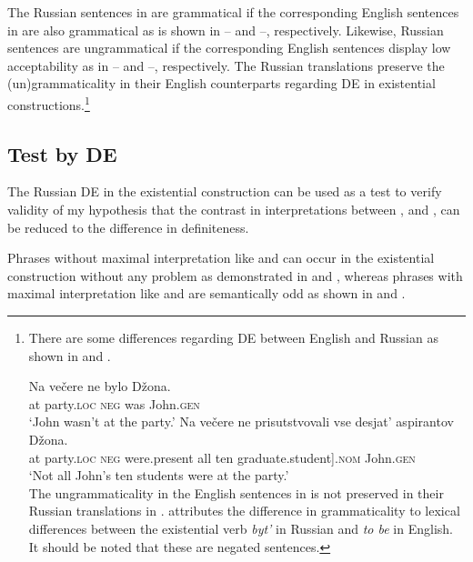 \documentclass[output=paper,
colorlinks,
citecolor=brown,
newtxmath
]{langscibook}
\begin{document}
\noindent The Russian sentences in  are grammatical if the corresponding English sentences in  are also grammatical as is shown in -- and --, respectively. Likewise, Russian sentences are ungrammatical if the corresponding English sentences display low acceptability as in -- and --, respectively. The Russian translations preserve the (un)grammaticality in their English counterparts regarding DE in existential constructions.\footnote{There are some differences regarding DE between English and Russian as shown in  and .
    \ea\label{john-engl}
	\z\z

	\ea\label{Dzon}
	\ea
	\gll	Na večere ne bylo Džona.\\
	at party.\textsc{loc} \textsc{neg} was John.\textsc{gen}\\
	\glt `John wasn't at the party.'
	\ex
	\gll	Na večere ne prisutstvovali {} vse desjat' aspirantov Džona.\\
	at party.\textsc{loc} \textsc{neg} were.present \minsp{[} all ten graduate.student].\textsc{nom} John.\textsc{gen}\\
	\glt `Not all John's ten students were at the party.'
	\\ \hfill \citep[134-135]{Paducheva2000}
	\z\z
    \noindent The ungrammaticality in the English sentences in  is not preserved in their Russian translations in . \citet{Paducheva2000} attributes the difference in grammaticality to lexical differences between the existential verb \textit{byt'} in Russian and \textit{to be} in English. It should be noted that these are negated sentences.}

\subsection{Test by DE}\label{sec:testDE}

The Russian DE in the existential construction can be used as a test to verify validity of my hypothesis that the contrast in interpretations between ,  and ,  can be reduced to the difference in definiteness.

Phrases without maximal interpretation like  and  can occur in the existential construction without any problem as demonstrated in  and , whereas phrases with maximal interpretation like  and  are semantically odd as shown in  and .
\end{document}
